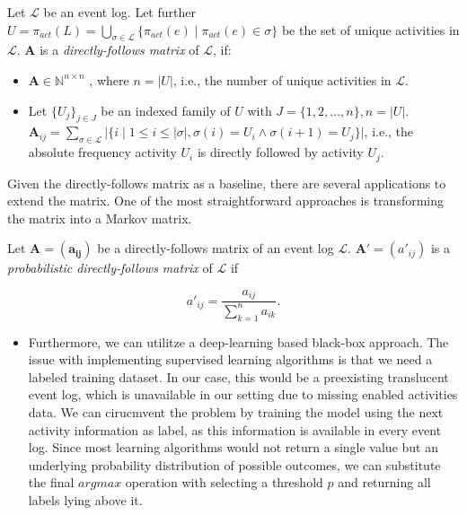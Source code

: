 \begin{definition}
    Let $\mathcal{L}$ be an event log. Let further $U = \pi_{act}(L) = \bigcup\limits_{\sigma \in \mathcal{L}} \{ \pi_{act}(e) \mid \pi_{act}(e) \in \sigma \}$ be the set of unique activities in $\mathcal{L}$. $\mathbf{A}$ is a \emph{directly-follows matrix} of $\mathcal{L}$, if:

    \begin{itemize}
        \item $\mathbf{A} \in \mathbb{N}^{n \times n}$ , where $n = \lvert U \rvert$, i.e., the number of unique activities in $\mathcal{L}$.
        
        \item Let $\{ U_j \}_{j \in J}$ be an indexed family of $U$ with $J = \{ 1, 2, \dots, n\}, n = \lvert U \rvert$. $\mathbf{A}_{ij} = \sum\limits_{\sigma \in \mathcal{L}} \Big| \{ i \mid 1 \leq i \leq \lvert \sigma \rvert, \sigma(i) = U_i \land \sigma(i+1) = U_j \} \Big|$, i.e., the absolute frequency activity $U_i$ is directly followed by activity $U_j$.
    \end{itemize}
\end{definition}

Given the directly-follows matrix as a baseline, there are several applications to extend the matrix. One of the most straightforward approaches is transforming the matrix into a Markov matrix.

\begin{definition}
    Let $\mathbf{A = (a_{ij})}$ be a directly-follows matrix of an event log $\mathcal{L}$. $\mathbf{A'} = (a'_{ij})$ is a \emph{probabilistic directly-follows matrix} of $\mathcal{L}$ if

    \[
        a'_{ij} = \frac{a_{ij}}{\sum\limits_{k=1}^{n} a_{ik}}.
    \]

\end{definition}



\begin{itemize}
    
    \item Furthermore, we can utilitze a deep-learning based black-box approach. The issue with implementing supervised learning algorithms is that we need a labeled training dataset. In our case, this would be a preexisting translucent event log, which is unavailable in our setting due to missing enabled activities data. We can cirucmvent the problem by training the model using the next activity information as label, as this information is available in every event log. Since most learning algorithms would not return a single value but an underlying probability distribution of possible outcomes, we can substitute the final $\mathit{argmax}$ operation with selecting a threshold $p$ and returning all labels lying above it.
\end{itemize}



